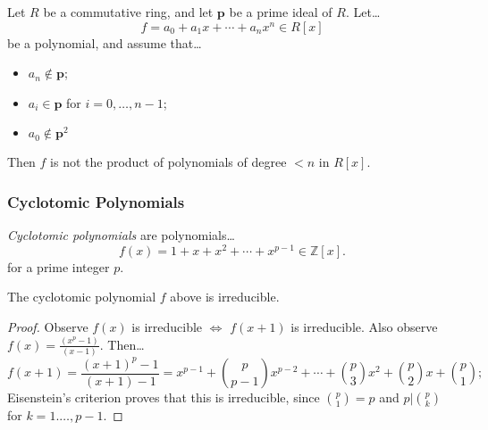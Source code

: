 \begin{proposition}
\label{eisenstein}
Let $R$ be a commutative ring, and let $\textbf{p}$ be a prime ideal of $R$. Let\dots
$$f = a_0 + a_1 x + \cdots + a_n x^n \in R[x]$$
be a polynomial, and assume that\dots
\begin{itemize}
  \item $a_n \not \in \textbf{p}$;
  \item $a_i \in \textbf{p}$ for $i = 0,\dots,n-1$;
  \item $a_0 \not \in \textbf{p}^2$
\end{itemize}
Then $f$ is not the product of polynomials of degree $<n$ in $R[x]$.
\end{proposition}

\subsubsection{Cyclotomic Polynomials}\label{cyclotomic}
\emph{Cyclotomic polynomials} are polynomials\dots
$$f(x) = 1 + x + x^2 + \cdots + x^{p-1} \in \mathbb{Z}[x].$$
for a prime integer $p$.

\begin{proposition}
The cyclotomic polynomial $f$ above is irreducible.
\end{proposition}

\begin{proof}
Observe $f(x)$ is irreducible $\Leftrightarrow$ $f(x+1)$ is irreducible. Also observe $f(x) = \frac{(x^p-1)}{(x-1)}$. Then\dots
$$f(x+1) = \frac{(x+1)^p - 1}{(x+1)-1} = x^{p-1} + {p \choose p-1}x^{p-2} + \cdots + {p \choose 3}x^{2} + {p \choose 2}x + {p \choose 1};$$
Eisenstein's criterion proves that this is irreducible, since ${p \choose 1} = p$ and $p | {p \choose k}$ for $k = 1. \dots, p-1$.
\end{proof}